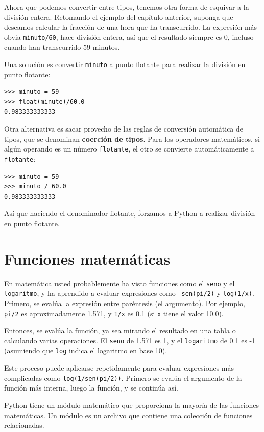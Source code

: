 Ahora que podemos convertir entre tipos, tenemos otra forma de 
esquivar a la división entera. Retomando el ejemplo del capítulo
anterior, suponga que deseamos calcular la fracción de una hora
que ha transcurrido. La expresión más obvia \texttt{minuto/60}, 
hace división entera, así que el resultado siempre es 0, incluso
cuando han transcurrido 59 minutos.

Una solución es convertir \texttt{minuto} a punto flotante
para realizar la  división  en punto flotante:

\beforeverb
\begin{verbatim}
>>> minuto = 59
>>> float(minute)/60.0
0.983333333333
\end{verbatim}
\afterverb
%
Otra alternativa es sacar provecho de las reglas de conversión
automática de tipos, que se denominan  {\bf coerción de tipos}.
Para los operadores matemáticos, si algún operando es un número
 \texttt{flotante}, el otro se convierte automáticamente a  \texttt{flotante}:

\beforeverb
\begin{verbatim}
>>> minuto = 59
>>> minuto / 60.0
0.983333333333
\end{verbatim}
\afterverb
%
Así que haciendo el denominador flotante, forzamos a Python a realizar
división en punto flotante.

\section{Funciones matemáticas}

En matemática usted probablemente ha visto funciones como el \texttt{seno} y el 
\texttt{logaritmo}, y ha aprendido a evaluar expresiones como {\tt
sen(pi/2)} y \texttt{log(1/x)}.  Primero, se evalúa la expresión entre paréntesis
(el argumento).  Por ejemplo, \texttt{pi/2} es aproximadamente 
1.571, y \texttt{1/x} es 0.1 (si \texttt{x} tiene el valor 10.0).

Entonces, se evalúa la función, ya sea mirando el resultado en una tabla
o calculando varias operaciones. El  \texttt{seno} de 1.571
es 1, y el \texttt{logaritmo} de 0.1 es -1 (asumiendo que  \texttt{log}
indica el logaritmo en base 10).

Este proceso puede aplicarse repetidamente para evaluar expresiones
más complicadas como  \texttt{log(1/sen(pi/2))}.  Primero se evalúa el argumento
de la función más interna, luego la función, y se continúa así.

Python tiene un módulo matemático que proporciona la mayoría de las funciones
matemáticas. Un módulo es un archivo que contiene una colección de
funciones relacionadas.

